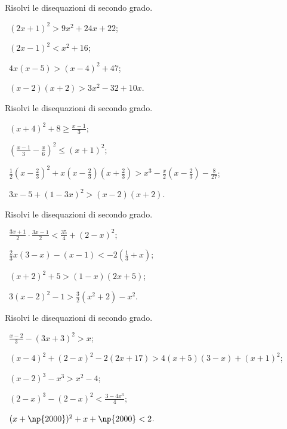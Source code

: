 \begin{esercizio}[\Ast]
 \label{ese:4.14}
Risolvi le disequazioni di secondo grado.
\begin{multicols}{2}
 \begin{enumeratea}
 \item~$(2x+1)^{2}>9x^{2}+24x+22$;
 \item~$(2x-1)^{2}<x^{2}+16$;
 \item~$4x(x-5)>(x-4)^{2}+47$;
 \item~$(x-2)(x+2)>3x^{2}-32+10x$.
 \end{enumeratea}
 \end{multicols}
\end{esercizio}

\begin{esercizio}[\Ast]
\label{ese:4.15}
Risolvi le disequazioni di secondo grado.
 \begin{enumeratea}
 \item~$(x+4)^2+8\ge \frac{x-1} 3$;
 \item~$\left(\frac{x-1} 3-\frac x 6\right)^2\le (x+1)^2$;
 \item~$\frac 1 2\left(x-\frac 2 3\right)^2+x\left(x-\frac 2 3\right)\left(x+\frac 2 3\right)>x^3-\frac x 2\left(x-\frac 2 3\right)-\frac 8{27}$;
 \item~$3x-5+(1-3x)^2>(x-2)(x+2)$.
 \end{enumeratea}
\end{esercizio}

\begin{esercizio}[\Ast]
 \label{ese:4.16}
Risolvi le disequazioni di secondo grado.
\begin{multicols}{2}
 \begin{enumeratea}
 \item~$\frac{3x+1}{2}\cdot\frac{3x-1}{2}<\frac{35}{4}+(2-x)^{2}$;
 \item~$\frac{2}{3}x(3-x)-(x-1)<-2\left(\frac{1}{3}+x\right)$;
 \item~$(x+2)^{2}+5>(1-x)(2x+5)$;
 \item~$3(x-2)^{2}-1>\frac{3}{2}\left(x^{2}+2\right)-x^{2}$.
 \end{enumeratea}
 \end{multicols}
\end{esercizio}

\begin{esercizio}[\Ast]
\label{ese:4.17}
Risolvi le disequazioni di secondo grado.
 \begin{enumeratea}
 \item~$\frac{x-2} 3-(3x+3)^2>x$;
 \item~$(x-4)^2+(2-x)^2-2(2x+17)>4(x+5)(3-x)+(x+1)^2$;
 \item~$(x-2)^3-x^3>x^2-4$;
 \item~$(2-x)^3-(2-x)^2<\frac{3-4x^3} 4$;
 \item~$(x+\np{2000})^2+x+\np{2000}<2$.
 \end{enumeratea}
\end{esercizio}

